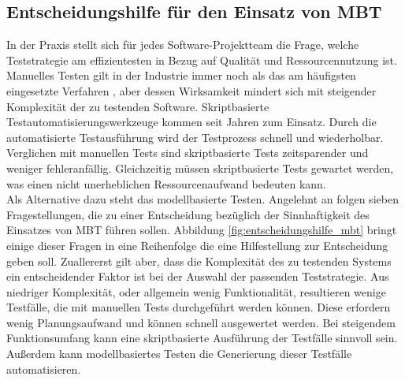 \subsection{Entscheidungshilfe für den Einsatz von MBT}
\label{sec:entscheidungshilfe}
In der Praxis stellt sich für jedes Software-Projektteam die Frage, welche Teststrategie am effizientesten in Bezug auf Qualität und Ressourcennutzung ist. Manuelles Testen gilt in der Industrie immer noch als das am häufigsten eingesetzte Verfahren \cite{guldali_starthilfe_2010}, aber dessen Wirksamkeit mindert sich mit steigender Komplexität der zu testenden Software. Skriptbasierte Testautomatisierungswerkzeuge kommen seit Jahren zum Einsatz. Durch die automatisierte Testausführung wird der Testprozess schnell und wiederholbar. Verglichen mit manuellen Tests sind skriptbasierte Tests zeitsparender und weniger fehleranfällig. Gleichzeitig müssen skriptbasierte Tests gewartet werden, was einen nicht unerheblichen Ressourcenaufwand bedeuten kann.\\
Als Alternative dazu steht das modellbasierte Testen. Angelehnt an \citeauthor{guldali_starthilfe_2010} \cite{guldali_starthilfe_2010} folgen sieben Fragestellungen, die zu einer Entscheidung bezüglich der Sinnhaftigkeit des Einsatzes von \Gls{MBT} führen sollen. Abbildung \ref{fig:entscheidungshilfe_mbt} bringt einige dieser Fragen in eine Reihenfolge die eine Hilfestellung zur Entscheidung geben soll. Zuallererst gilt aber, dass die Komplexität des zu testenden Systems ein entscheidender Faktor ist bei der Auswahl der passenden Teststrategie. Aus niedriger Komplexität, oder allgemein wenig Funktionalität, resultieren wenige Testfälle, die mit manuellen Tests durchgeführt werden können. Diese erfordern wenig Planungsaufwand und können schnell ausgewertet werden. Bei steigendem Funktionsumfang kann eine skriptbasierte Ausführung der Testfälle sinnvoll sein. Außerdem kann modellbasiertes Testen die Generierung dieser Testfälle automatisieren. 

